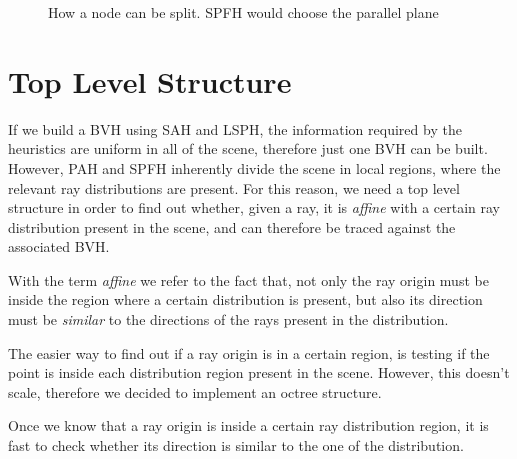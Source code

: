 \documentclass{PoliMi_MasterThesis}
\begin{document}
\begin{figure}[H]
{    }
	\caption{How a node can be split. SPFH would choose the parallel plane}
    \label{fig:nodes_splitting_intro}
\end{figure}

\section*{Top Level Structure}
If we build a BVH using SAH and LSPH, the information required by the heuristics are uniform in all of the scene, therefore just one BVH can be built. However, PAH and SPFH inherently divide the scene in local regions, where the relevant ray distributions are present. For this reason, we need a top level structure in order to find out whether, given a ray, it is \textit{affine} with a certain ray distribution present in the scene, and can therefore be traced against the associated BVH.

With the term \textit{affine} we refer to the fact that, not only the ray origin must be inside the region where a certain distribution is present, but also its direction must be \textit{similar} to the directions of the rays present in the distribution.

The easier way to find out if a ray origin is in a certain region, is testing if the point is inside each distribution region present in the scene. However, this doesn't scale, therefore we decided to implement an octree structure.

Once we know that a ray origin is inside a certain ray distribution region, it is fast to check whether its direction is similar to the one of the distribution.
\end{document}
